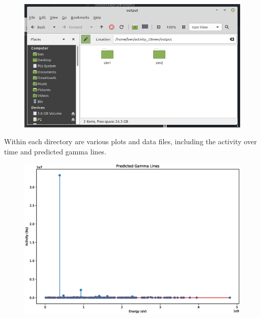 \documentclass[12pt,twoside]{manual}
\begin{document}
\begin{figure}[h]
  \begin{center}
    \includegraphics[scale=0.30]{img/output1}
  \end{center}
\end{figure}

\FloatBarrier

Within each directory are various plots and data files, including the activity over time and predicted gamma lines.

\FloatBarrier

\begin{figure}[h]
  \begin{center}
    \includegraphics[scale=0.4]{img/end_of_beam_gamma_lines.eps}
  \end{center}
\end{figure}
\end{document}
